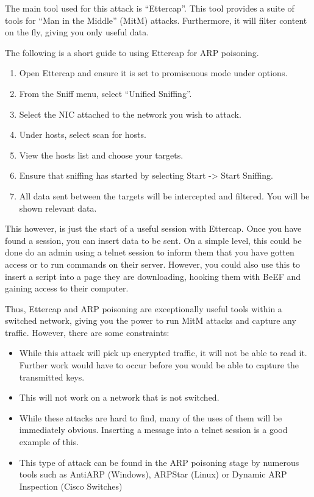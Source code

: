 \documentclass[a4paper,11pt]{report}
\begin{document}
		The main tool used for this attack is ``Ettercap''. 
		This tool provides a suite of tools for ``Man in the Middle'' (MitM) attacks. 
		Furthermore, it will filter content on the fly, giving you only useful data. 

		The following is a short guide to using Ettercap for ARP poisoning. 
		\begin{enumerate}
			\item Open Ettercap and ensure  it is set to promiscuous mode under options. 
			\item From the Sniff menu, select ``Unified Sniffing''. 
			\item Select the NIC attached to the network you wish to attack. 
			\item Under hosts, select scan for hosts. 
			\item View the hosts list and choose your targets. 
			\item Ensure that sniffing has started by selecting Start -> Start Sniffing. 
			\item All data sent between the targets will be intercepted and filtered. 
				You will be shown relevant data. 
		\end{enumerate}
		This however, is just the start of a useful session with Ettercap. 
		Once you have found a session, you can insert data to be sent. 
		On a simple level, this could be done do an admin using a telnet session to inform them that you have gotten access or to run commands on their server. 
		However, you could also use this to insert a script into a page they are downloading, hooking them with BeEF and gaining access to their computer. 

		Thus, Ettercap and ARP poisoning are exceptionally useful tools within a switched network, 
		giving you the power to run MitM attacks and capture any traffic. 
		However, there are some constraints:
		\begin{itemize}
			\item While this attack will pick up encrypted traffic, it will not be able to read it. 
				Further work would have to occur before you would be able to capture the transmitted keys. 
			\item This will not work on a network that is not switched. 
			\item While these attacks are hard to find, many of the uses of them will be immediately obvious. 
				Inserting a message into a telnet session is a good example of this. 
			\item This type of attack can be found in the ARP poisoning stage by numerous tools such as 
				AntiARP (Windows), ARPStar (Linux) or Dynamic ARP Inspection (Cisco Switches)
		\end{itemize}
\end{document}
